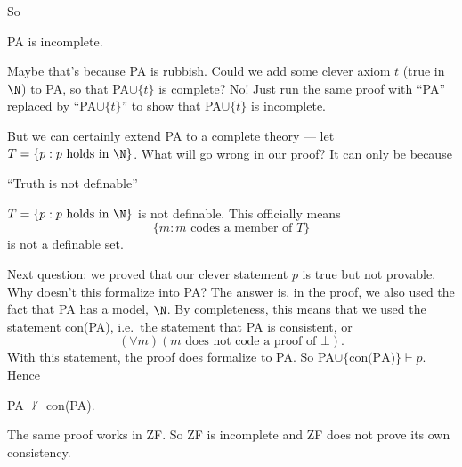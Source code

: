 \documentclass[a4paper]{article}
\begin{document}
So
\begin{thm}
  PA is incomplete.
\end{thm}

Maybe that's because PA is rubbish. Could we add some clever axiom $t$ (true in $\N$) to PA, so that PA$\cup \{t\}$ is complete? No! Just run the same proof with ``PA'' replaced by ``PA$\cup \{t\}$'' to show that PA$\cup\{t\}$ is incomplete.

But we can certainly extend PA to a complete theory --- let $T = \{p: p\text{ holds in }\N\}$. What will go wrong in our proof? It can only be because
\begin{thm}
  ``Truth is not definable''

  $T= \{p: p\text{ holds in }\N\}$ is not definable. This officially means
  \[
    \{m: m\text{ codes a member of }T\}
  \]
  is not a definable set.
\end{thm}

Next question: we proved that our clever statement $p$ is true but not provable. Why doesn't this formalize into PA? The answer is, in the proof, we also used the fact that PA has a model, $\N$. By completeness, this means that we used the statement con(PA), i.e.\ the statement that PA is consistent, or
\[
  (\forall m)(m\text{ does not code a proof of }\bot).
\]
With this statement, the proof does formalize to PA. So PA$\cup \{\text{con(PA)}\}\vdash p$. Hence
\begin{thm}
  PA $\not \vdash$ con(PA).
\end{thm}

The same proof works in ZF. So ZF is incomplete and ZF does not prove its own consistency.

\printindex
\end{document}
